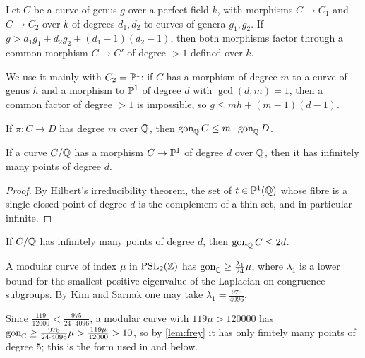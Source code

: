 \begin{lemma}\label{lem:CS}
Let $C$ be a curve of genus $g$ over a perfect field $k$, with morphisms $C\to C_1$ and $C\to C_2$ over $k$ of
degrees $d_1,d_2$ to curves of genera $g_1,g_2$. If $g>d_1g_1+d_2g_2+(d_1-1)(d_2-1)$, then both morphisms
factor through a common morphism $C\to C'$ of degree $>1$ defined over $k$.
\end{lemma}

We use it mainly with $C_2=\mathbb{P}^1$: if $C$ has a morphism of degree $m$ to a curve of genus $h$ and a morphism
to $\mathbb{P}^1$ of degree $d$ with $\gcd(d,m)=1$, then a common factor of degree $>1$ is impossible, so
$g\le mh+(m-1)(d-1)$.

\begin{lemma}[Pullback]\label{lem:pullback}
If $\pi\colon C\to D$ has degree $m$ over $\mathbb{Q}$, then $\operatorname{gon}_{\mathbb{Q}} C\le m\cdot\operatorname{gon}_{\mathbb{Q}} D$.
\end{lemma}

\begin{lemma}\label{lem:hilbert}
If a curve $C/\mathbb{Q}$ has a morphism $C\to\mathbb{P}^1$ of degree $d$ over $\mathbb{Q}$, then it has infinitely many points
of degree $d$.
\end{lemma}
\begin{proof}
By Hilbert's irreducibility theorem, the set of $t\in\mathbb{P}^1(\mathbb{Q})$ whose fibre is a single closed point of degree $d$
is the complement of a thin set, and in particular infinite.
\end{proof}

\begin{lemma}\label{lem:frey}
If $C/\mathbb{Q}$ has infinitely many points of degree $d$, then $\operatorname{gon}_{\mathbb{Q}} C\le 2d$.
\end{lemma}

\begin{lemma}\label{lem:abramovich}
A modular curve of index $\mu$ in $\mathrm{PSL}_2(\mathbb{Z})$ has $\operatorname{gon}_{\mathbb C}\ge\frac{\lambda_1}{24}\mu$, where
$\lambda_1$ is a lower bound for the smallest positive eigenvalue of the Laplacian on congruence subgroups. By Kim and
Sarnak \cite[Appendix~2]{KimSarnak2003} one may take $\lambda_1=\frac{975}{4096}$.
\end{lemma}

Since $\frac{119}{12000}<\frac{975}{24\cdot4096}$, a modular curve with $119\mu>120000$ has
$\operatorname{gon}_{\mathbb C}\ge\frac{975}{24\cdot4096}\mu>\frac{119\mu}{12000}>10$, so by \cref{lem:frey} it has only finitely
many points of degree $5$; this is the form used in \cite[Theorem~3.16]{Orlic2025} and below.
